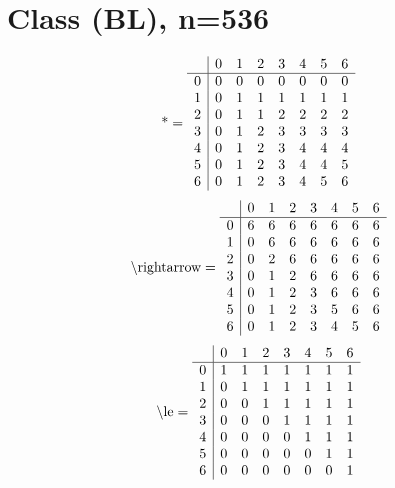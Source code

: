 \documentclass[11pt]{article}
\begin{document}
\section{Class (BL), n=536}
\[\text{*} = 
\begin{array}{r | r r r r r r r}
 & 0 & 1 & 2 & 3 & 4 & 5 & 6 \\ \hline
0 & 0 & 0 & 0 & 0 & 0 & 0 & 0 \\
1 & 0 & 1 & 1 & 1 & 1 & 1 & 1 \\
2 & 0 & 1 & 1 & 2 & 2 & 2 & 2 \\
3 & 0 & 1 & 2 & 3 & 3 & 3 & 3 \\
4 & 0 & 1 & 2 & 3 & 4 & 4 & 4 \\
5 & 0 & 1 & 2 & 3 & 4 & 4 & 5 \\
6 & 0 & 1 & 2 & 3 & 4 & 5 & 6 \\
\end{array}
\]
\[\text{\textbackslash rightarrow} = 
\begin{array}{r | r r r r r r r}
 & 0 & 1 & 2 & 3 & 4 & 5 & 6 \\ \hline
0 & 6 & 6 & 6 & 6 & 6 & 6 & 6 \\
1 & 0 & 6 & 6 & 6 & 6 & 6 & 6 \\
2 & 0 & 2 & 6 & 6 & 6 & 6 & 6 \\
3 & 0 & 1 & 2 & 6 & 6 & 6 & 6 \\
4 & 0 & 1 & 2 & 3 & 6 & 6 & 6 \\
5 & 0 & 1 & 2 & 3 & 5 & 6 & 6 \\
6 & 0 & 1 & 2 & 3 & 4 & 5 & 6 \\
\end{array}
\]
\[\text{\textbackslash le} = 
\begin{array}{r | r r r r r r r}
 & 0 & 1 & 2 & 3 & 4 & 5 & 6 \\ \hline
0 & 1 & 1 & 1 & 1 & 1 & 1 & 1 \\
1 & 0 & 1 & 1 & 1 & 1 & 1 & 1 \\
2 & 0 & 0 & 1 & 1 & 1 & 1 & 1 \\
3 & 0 & 0 & 0 & 1 & 1 & 1 & 1 \\
4 & 0 & 0 & 0 & 0 & 1 & 1 & 1 \\
5 & 0 & 0 & 0 & 0 & 0 & 1 & 1 \\
6 & 0 & 0 & 0 & 0 & 0 & 0 & 1 \\
\end{array}
\]
\end{document}
